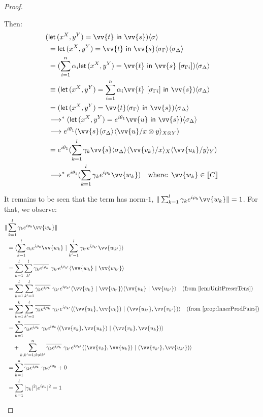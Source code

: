 \documentclass[runningheads,orivec,envcountsame,envcountsect]{llncs}
\newcommand\lra{\longrightarrow}
\newcommand\ansubst[2]{\ensuremath{\langle #1 \rangle_{#2}}}
\def\scal#1#2{\langle{#1}~|~{#2}\rangle}
\def\Pair#1#2{(#1,#2)} %
\def\letkeyword{\mathsf{let}}
\def\inkeyword{\mathsf{in}}
\def\LetP#1#2#3#4#5#6{\letkeyword\,\Pair{#1^{#2}}{#3^{#4}}=#5~\inkeyword~#6}
\def\eval{\lra^*}
\def\sem#1{\llbracket#1\rrbracket}
\begin{document}
\begin{proof}
\begin{description}
    Then:
    \begin{align*}
        (&\LetP{x}{X}{y}{Y}{\vv{t}}{\vv{s}})\ansubst{\sigma}{} \\
        &= \LetP{x}{X}{y}{Y}{\vv{t}}{\vv{s}}\ansubst{\sigma_\Gamma}{}\ansubst{\sigma_\Delta}{}\\
        &=(\sum_{i=1}^{n}\alpha_i\LetP{x}{X}{y}{Y}{\vv{t}}{\vv{s}}\ [\sigma_{\Gamma i}])\ansubst{\sigma_{\Delta}}{}\\
        &\equiv (\LetP{x}{X}{y}{Y}{\sum_{i=1}^{n}\alpha_i\vv{t}\ [\sigma_{\Gamma i}]}{\vv{s}})\ansubst{\sigma_\Delta}{}\\
        &=(\LetP{x}{X}{y}{Y}{\vv{t}\ansubst{\sigma_\Gamma}{}}{\vv{s}})\ansubst{\sigma_\Delta}{}\\
        &\eval(\LetP{x}{X}{y}{Y}{e^{i\theta_1}\vv{u}}{\vv{s}})\ansubst{\sigma_\Delta}{}\\
        &\lra e^{i\theta_1}(\vv{s}\ansubst{\sigma_\Delta}{}\ansubst{\vv{u}/x\otimes y}{X\otimes Y})\\
        &=e^{i\theta_1} (\sum_{k=1}^{l}\gamma_k\vv{s}\ansubst{\sigma_\Delta}{}\ansubst{\vv{v_k}/x}{X}\ansubst{\vv{u_k}/y}{Y})\\
        &\eval e^{i\theta_1} (\sum_{k=1}^{l}\gamma_k e^{i\rho_k} \vv{w_k})\quad\text{where: }\vv{w_k}\in\sem{C}\\
    \end{align*}

    It remains to be seen that the term has norm-$1$, $\|\sum_{k=1}^{l}\gamma_k e^{i\rho_k} \vv{w_k}\|=1$. For that, we observe:
    \begin{align*}
        \|&\sum_{k=1}^{l}\gamma_k e^{i\rho_k} \vv{w_k}\| \\
        &= \scal{\sum_{k=1}^{l}\alpha_i e^{i\rho_k} \vv{w_k}}{\sum_{k'=1}^{l}\gamma_{k'} e^{i\rho_{k'}} \vv{w_{k'}}}\\
        &= \sum_{k=1}^{l}\sum_{k'}^{l}\overline{\gamma_k e^{i\rho_k}}\  \gamma_{k'} e^{i\rho_{k'}}\scal{\vv{w_k}}{\vv{w_{k'}}}\\
        &=\sum_{k=1}^{l}\sum_{k'=1}^{l}\overline{\gamma_k e^{i\rho_k}}\ \gamma_{k'} e^{i\rho_{k'}} \scal{\vv{v_k}}{\vv{v_{k'}}}\scal{\vv{u_k}}{\vv{u_{k'}}}\quad(\text{from \Cref{lem:UnitPreserTens}})\\
        &= \sum_{k=1}^{k}\sum_{k'=1}^{l}\overline{\gamma_k e^{i\rho_k}}\  \gamma_{k'} e^{i\rho_{k'}} \scal{\Pair{\vv{u_k}}{\vv{v_k}}}{\Pair{\vv{u_{k'}}}{\vv{v_{k'}}}}\quad(\text{from \Cref{prop:InnerProdPairs}})\\
        &=\sum_{k=1}^n \overline{\gamma_k e^{i\rho_k}}\ \gamma_k e^{i\rho_k} \scal{\Pair{\vv{v_k}}{\vv{u_k}}}{\Pair{\vv{v_k}}{\vv{u_k}}} \\
        & \quad + \sum_{k,k'=1; k\neq k'}^n \overline{\gamma_k e^{i\rho_k}}\  \gamma_{k'} e^{i\rho_{k'}} \scal{\Pair{\vv{v_k}}{\vv{u_k}}}{\Pair{\vv{v_{k'}}}{\vv{u_{k'}}}}\\
        &= \sum_{k=1}^n \overline{\gamma_k e^{i\rho_k}}\ \gamma_k e^{i\rho_k} + 0 \\
        &= \sum_{k=1}^{l} |\gamma_k|^2 |e^{i\rho_k}|^2 = 1
    \end{align*}


\end{description}
\end{proof}
\end{document}
